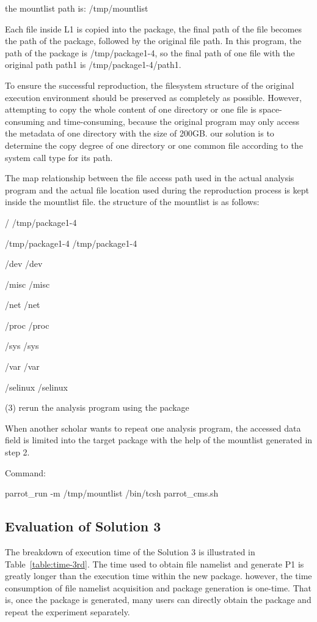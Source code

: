 \documentclass{acm_proc_article-sp}
\begin{document}
the mountlist path is: /tmp/mountlist

Each file inside L1 is copied into the package, the final path of the file becomes the path of the package, followed by the original file path. In this program, the path of the package is /tmp/package1-4, so the final path of one file with the original path path1 is /tmp/package1-4/path1.

To ensure the successful reproduction, the filesystem structure of the original execution environment should be preserved as completely as possible. However, attempting to copy the whole content of one directory or one file is space-consuming and time-consuming, because the original program may only access the metadata of one directory with the size of 200GB. our solution is to determine the copy degree of one directory or one common file according to the system call type for its path.

The map relationship between the file access path used in the actual analysis program and the actual file location used during the reproduction process is kept inside the mountlist file. the structure of the mountlist is as follows:

/ /tmp/package1-4 

/tmp/package1-4 /tmp/package1-4 

/dev /dev 

/misc /misc 

/net /net 

/proc /proc 

/sys /sys 

/var /var 

/selinux /selinux

(3) rerun the analysis program using the package

When another scholar wants to repeat one analysis program, the accessed data field is limited into the target package with the help of the mountlist generated in step 2. 

Command:

parrot\_run -m /tmp/mountlist /bin/tcsh parrot\_cms.sh

\subsection{Evaluation of Solution 3}
The breakdown of execution time of the Solution 3 is illustrated in Table~\ref{table:time-3rd}. The time used to obtain file namelist and generate P1 is greatly longer than the execution time within the new package. however, the time consumption of file namelist acquisition and package generation is one-time. That is, once the package is generated, many users can directly obtain the package and repeat the experiment separately. 
\end{document}
